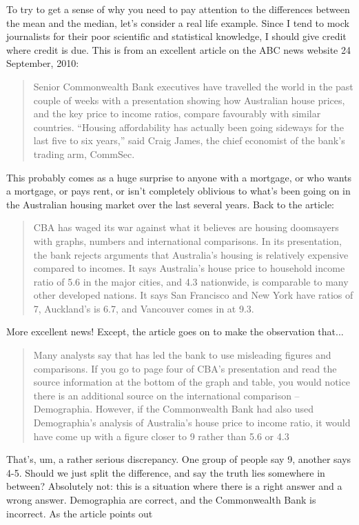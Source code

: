To try to get a sense of why you need to pay attention to the differences between the mean and the median, let's consider a real life example. Since I tend to mock journalists for their poor scientific and statistical knowledge, I should give credit where credit is due. This is from an excellent article on the ABC news website 24 September, 2010:
\begin{quote}
Senior Commonwealth Bank executives have travelled the world in the past couple of weeks with a presentation showing how Australian house prices, and the key price to income ratios, compare favourably with similar countries. ``Housing affordability has actually been going sideways for the last five to six years,'' said Craig James, the chief economist of the bank's trading arm, CommSec.
\end{quote}
This probably comes as a huge surprise to anyone with a mortgage, or who wants a mortgage, or pays rent, or isn't completely oblivious to what's been going on in the Australian housing market over the last several years. Back to the article:
\begin{quote}
CBA has waged its war against what it believes are housing doomsayers with graphs, numbers and international comparisons. In its presentation, the bank rejects arguments that Australia's housing is relatively expensive compared to incomes. It says Australia's house price to household income ratio of 5.6 in the major cities, and 4.3 nationwide, is comparable to many other developed nations. It says San Francisco and New York have ratios of 7, Auckland's is 6.7, and Vancouver comes in at 9.3.
\end{quote}
More excellent news! Except, the article goes on to make the observation that...
\begin{quote}
Many analysts say that has led the bank to use misleading figures and comparisons. If you go to page four of CBA's presentation and read the source information at the bottom of the graph and table, you would notice there is an additional source on the international comparison -- Demographia. However, if the Commonwealth Bank had also used Demographia's analysis of Australia's house price to income ratio, it would have come up with a figure closer to 9 rather than 5.6 or 4.3
\end{quote}
That's, um, a rather serious discrepancy. One group of people say 9, another says 4-5. Should we just split the difference, and say the truth lies somewhere in between? Absolutely not: this is a situation where there is a right answer and a wrong answer. Demographia are correct, and the Commonwealth Bank is incorrect. As the article points out
